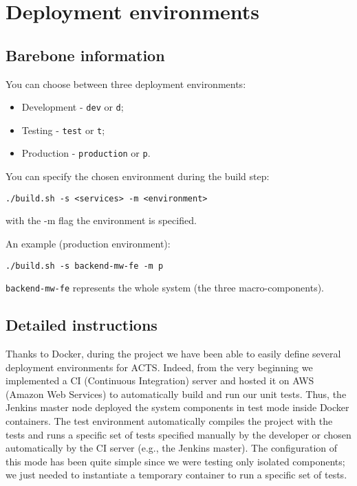 
\section{Deployment environments}

\subsection{Barebone information}

You can choose between three deployment environments:

\begin{itemize}
\item Development - \texttt{dev} or \texttt{d};
\item Testing - \texttt{test} or \texttt{t};
\item Production - \texttt{production} or \texttt{p}.
\end{itemize}

You can specify the chosen environment during the build step:

\begin{lstlisting}
./build.sh -s <services> -m <environment>
\end{lstlisting}

with the -m flag the environment is specified.


An example (production environment):

\begin{lstlisting}
./build.sh -s backend-mw-fe -m p
\end{lstlisting}

\texttt{backend-mw-fe} represents the whole system (the three macro-components).


\subsection{Detailed instructions}
Thanks to Docker, during the project we have been able to easily define several
deployment environments for ACTS. Indeed, from the very beginning we implemented a CI (Continuous Integration) server and hosted it
on AWS (Amazon Web Services) to automatically build and run our unit tests.
Thus, the Jenkins master node deployed the
system components in test mode inside Docker containers.
The test environment automatically compiles the project with the tests and
runs a specific set of tests specified manually by the developer or chosen automatically by
the CI server (e.g., the Jenkins master). The configuration of this mode has been quite simple
since we were testing only isolated components;
we just needed to instantiate a temporary
container to run a specific set of tests.


